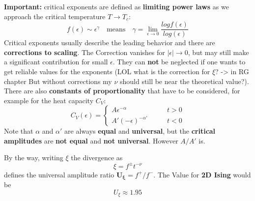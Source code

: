 	
	\textbf{Important:} critical exponents are defined as \textbf{limiting power laws} as we approach the critical temperature $T \rightarrow T_c$:
	\begin{equation}
		f(\epsilon) \sim \epsilon^\gamma \quad \text{means} \quad \gamma =	\lim_{\epsilon \rightarrow 0} \frac{log f(\epsilon)}{log(\epsilon)}
	\end{equation}
	Critical exponents usually describe the leading behavior and there are \textbf{corrections to scaling}. The Correction vanishes for $|\epsilon| \rightarrow 0$, but may still make a significant contribution for small $\epsilon$. They can \textbf{not} be neglected if one wants to get reliable values for the exponents (LOL what is the correction for $\xi$? -> in RG chapter But without corrections my $\nu$ should still be near the theoretical value?). There are also \textbf{constants of proportionality} that have to be considered, for example for the heat capacity $C_V$:
	\begin{equation}
		C_V(\epsilon) =	\begin{cases}
			A \epsilon^{-\alpha} \qquad &t > 0 \\
			A' (-\epsilon)^{-\alpha'} \qquad &t<0
		\end{cases}
	\end{equation}
	Note that $\alpha$ and $\alpha'$ are always \textbf{equal} and \textbf{universal}, but the \textbf{critical amplitudes} are \textbf{not equal} and \textbf{not universal}. However $A /	A'$ is.
	
	By the way, writing $\xi$ the divergence as
	\begin{equation}
		\xi =	f^\pm t^{- \nu}
	\end{equation}
	defines the universal amplitude ratio $\boldsymbol{U_\xi} =	f^+ /	f^-$. The Value for \textbf{2D Ising} would be
	\begin{equation}
		U_\xi \approx 1.95
	\end{equation}
	
